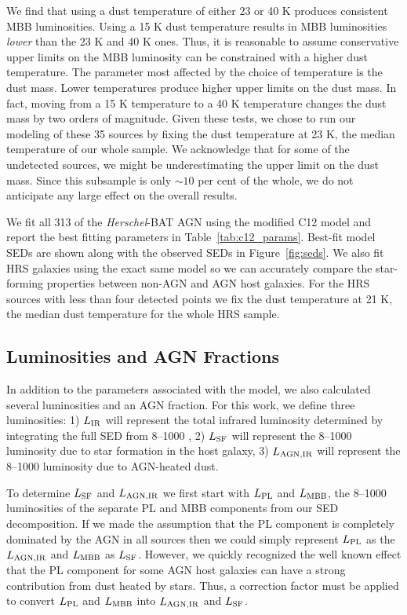 \documentclass[fleqn, usenatbib]{mnras}
\newcommand{\herschel}{\emph{Herschel}}
\begin{document}
We find that using a dust temperature of either 23 or 40 K produces consistent MBB luminosities. Using a 15 K dust temperature results in MBB luminosities \textit{lower} than the 23 K and 40 K ones. Thus, it is reasonable to assume conservative upper limits on the MBB luminosity can be constrained with a higher dust temperature. The parameter most affected by the choice of temperature is the dust mass. Lower temperatures produce higher upper limits on the dust mass. In fact, moving from a 15 K temperature to a 40 K temperature changes the dust mass by two orders of magnitude. Given these tests, we chose to run our modeling of these 35 sources by fixing the dust temperature at 23 K, the median temperature of our whole sample. We acknowledge that for some of the undetected sources, we might be underestimating the upper limit on the dust mass. Since this subsample is only $\sim10$ per cent of the whole, we do not anticipate any large effect on the overall results.

We fit all 313 of the \herschel-BAT AGN using the modified C12 model and report the best fitting parameters in Table~\ref{tab:c12_params}. Best-fit model SEDs are shown along with the observed SEDs in Figure~\ref{fig:seds}. We also fit HRS galaxies using the exact same model so we can accurately compare the star-forming properties between non-AGN and AGN host galaxies. For the HRS sources with less than four detected points we fix the dust temperature at 21 K, the median dust temperature for the whole HRS sample. 

\subsection{Luminosities and AGN Fractions}\label{sec:lums_agn_frac}
In addition to the parameters associated with the model, we also calculated several luminosities and an AGN fraction. For this work, we define three luminosities: 1) $L_{\rm IR}$ will represent the total infrared luminosity determined by integrating the full SED from 8--1000 \micron, 2) $L_{\rm SF}$ will represent the 8--1000 \micron{} luminosity due to star formation in the host galaxy, 3) $L_{\rm AGN, IR}$ will represent the 8--1000 \micron{} luminosity due to AGN-heated dust. 

To determine $L_{\rm SF}$ and $L_{\rm AGN, IR}$ we first start with $L_{\rm PL}$ and $L_{\rm MBB}$, the 8--1000 \micron{} luminosities of the separate PL and MBB components from our SED decomposition. If we made the assumption that the PL component is completely dominated by the AGN in all sources then we could simply represent $L_{\rm PL}$ as the $L_{\rm AGN, IR}$ and $L_{\rm MBB}$ as $L_{\rm SF}$. However, we quickly recognized the well known effect that the PL component for some AGN host galaxies can have a strong contribution from dust heated by stars. Thus, a correction factor must be applied to convert $L_{\rm PL}$ and $L_{\rm MBB}$ into $L_{\rm AGN, IR}$ and $L_{\rm SF}$.
\end{document}
